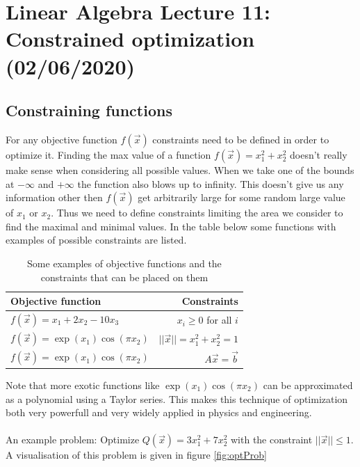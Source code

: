 \documentclass[11pt, a4paper]{article}
\begin{document}
\setcounter{section}{10}
\setcounter{equation}{0}

\section{Linear Algebra Lecture 11: Constrained optimization (02/06/2020)}


\subsection{Constraining functions}
For any objective function $f(\vec{x})$ constraints need to be defined in order to optimize it. Finding the max value of a function $f(\vec{x}) = x_1^2 + x_2^2$ doesn't really make sense when considering all possible values. When we take one of the bounds at $-\infty$ and $+\infty$ the function also blows up to infinity. This doesn't give us any information other then $f(\vec{x})$ get arbitrarily large for some random large value of $x_1$ or $x_2$. Thus we need to define constraints limiting the area we consider to find the maximal and minimal values. In the table below some functions with examples of possible constraints are listed.
\begin{table}[h]
  \caption{Some examples of objective functions and the constraints that can be placed on them} %
  \centering %
  \begin{tabular}{l|r} %
    \hline\hline %
    Objective function &  Constraints\\ [0.5ex] %
    \hline \hline%
    $f(\vec{x}) = x_1 + 2x_2 - 10x_3$ & $x_i \geq 0$ for all $i$\\ 
    $f(\vec{x}) = \exp(x_1)\cos(\pi x_2)$ & $||\vec{x}|| = x_1^2 + x_2^2 = 1$ \\
    $f(\vec{x}) = \exp(x_1)\cos(\pi x_2)$ & $A\vec{x} = \vec{b}$ \\
  \hline %
  \end{tabular}
  \label{tab:hresult}
\end{table}
Note that more exotic functions like $\exp(x_1)\cos(\pi x_2)$ can be approximated as a polynomial using a Taylor series. This makes this technique of optimization both very powerfull and very widely applied in physics and engineering.\\
\\
An example problem: Optimize $Q(\vec{x}) = 3x_1^2 + 7x_2^2$ with the constraint $||\vec{x}|| \leq 1$. A visualisation of this problem is given in figure \ref{fig:optProb}
\end{document}
